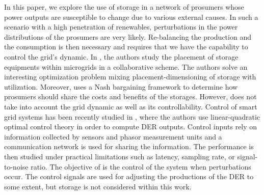 \documentclass[conference]{IEEEtran}
\begin{document}
In this paper, we explore the use of storage in a network of prosumers whose power outputs are susceptible to change due to various external causes. In such a scenario with a high penetration of renewables, perturbations in the power distributions of the prosumers are very likely. Re-balancing the production and the consumption is then necessary and requires that we have the capability to control the grid's dynamic. In \cite{Gkatzikis2015}, the authors study the placement of storage equipments within microgrids in a collaborative scheme. The authors solve an interesting optimization problem mixing placement-dimensioning of storage with utilization. Moreover, \cite{Gkatzikis2015} uses a Nash bargaining framework to determine how prosumers should share the costs and benefits of the storages. However, \cite{Gkatzikis2015} does not take into account the grid dynamic as well as its controllability. Control of smart grid systems has been recently studied in \cite{Farraj2015}, where the authors use linear-quadratic optimal control theory in order to compute DER outputs. Control inputs rely on information collected by sensors and phasor measurement units and a communication network is used for sharing the information. The performance is then studied under practical limitations such as latency, sampling rate, or signal-to-noise ratio. The objective of \cite{Farraj2015} is the control of the system when perturbations occur. The control signals are used for adjusting the productions of the DER to some extent, but storage is not considered within this work.



\end{document}

